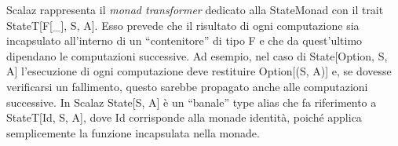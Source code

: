 Scalaz rappresenta il \textit{monad transformer} dedicato alla StateMonad con il trait StateT[F[\_], S, A]. Esso prevede che il risultato di ogni computazione sia incapsulato all'interno di un ``contenitore'' di tipo F e che da quest'ultimo dipendano le computazioni successive. Ad esempio, nel caso di State[Option, S, A] l'esecuzione di ogni computazione deve restituire Option[(S, A)] e, se dovesse verificarsi un fallimento, questo sarebbe propagato anche alle computazioni successive. In Scalaz State[S, A] è un ``banale'' type alias che fa riferimento a StateT[Id, S, A], dove Id corrisponde alla monade identità, poiché applica semplicemente la funzione incapsulata nella monade.


